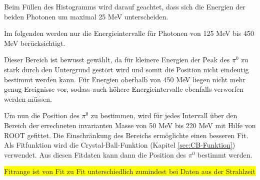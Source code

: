 \documentclass[a4paper,11pt,oneside,final,german,openbib,pdftex]{scrbook}
\begin{document}
{Beim Füllen des Histogramms wird darauf geachtet, dass sich die Energien der beiden Photonen um maximal 25 MeV unterscheiden.

Im folgenden werden nur die Energieintervalle f\"ur Photonen von 125 MeV bis 450 MeV ber\"ucksichtigt.

Dieser Bereich ist bewusst gew\"ahlt, da f\"ur kleinere Energien der Peak des $\pi^0$ zu stark durch den Untergrund gest\"ort wird und somit die Position nicht eindeutig bestimmt werden kann. F\"ur Energien oberhalb von 450 MeV liegen nicht mehr genug Ereignisse vor, sodass auch h\"ohere Energieintervalle ebenfalls verworfen werden m\"ussen. 


Um nun die Position des $\pi^0$ zu bestimmen, wird für jedes Intervall über den Bereich der errechneten invarianten Masse von 50 MeV bis 220 MeV mit Hilfe von ROOT gefittet. Die Einschr\"ankung des Bereichs erm\"oglichte einen besseren Fit. Als Fitfunktion wird die Crystal-Ball-Funktion (Kapitel \ref{sec:CB-Funktion}) verwendet. 
Aus diesen Fitdaten kann dann die Position des $\pi^0$ bestimmt werden.

\colorbox{yellow}{Fitrange ist von Fit zu Fit unterschiedlich zumindest bei Daten aus der Strahlzeit}
  
 
%		
 
}
\end{document}
